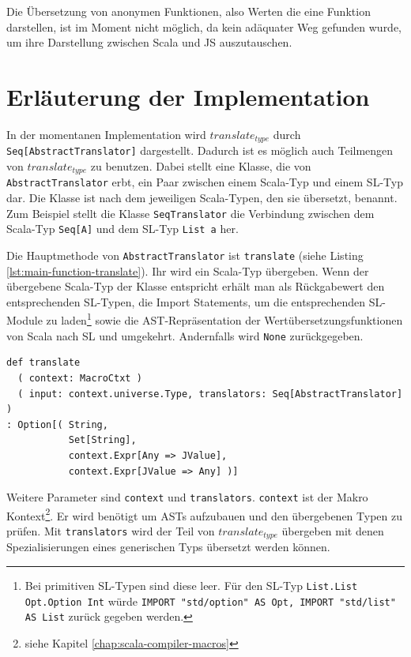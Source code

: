 \documentclass[12pt,bibtotoc]{scrreprt}
\begin{document}
Die Übersetzung von anonymen Funktionen, also Werten die eine Funktion darstellen, ist im Moment nicht möglich, da kein adäquater Weg gefunden wurde, um ihre Darstellung zwischen Scala und JS auszutauschen.

\section{Erläuterung der Implementation}
\label{sec:trans-implementation}

In der momentanen Implementation wird $translate_{type}$ durch \lstinline!Seq[AbstractTranslator]! dargestellt. Dadurch ist es möglich auch Teilmengen von $translate_{type}$ zu benutzen. Dabei stellt eine Klasse, die von \lstinline!AbstractTranslator! erbt, ein Paar zwischen einem Scala-Typ und einem SL-Typ dar. Die Klasse ist nach dem jeweiligen Scala-Typen, den sie übersetzt, benannt. Zum Beispiel stellt die Klasse \lstinline!SeqTranslator! die Verbindung zwischen dem Scala-Typ \lstinline!Seq[A]! und dem SL-Typ \lstinline!List a! her. 

Die Hauptmethode von \lstinline!AbstractTranslator! ist \lstinline!translate! (siehe Listing \ref{lst:main-function-translate}). Ihr wird ein Scala-Typ übergeben. Wenn der übergebene Scala-Typ der Klasse entspricht erhält man als Rückgabewert den entsprechenden SL-Typen, die Import Statements, um die entsprechenden SL-Module zu laden\footnote{Bei primitiven SL-Typen sind diese leer. Für den SL-Typ \lstinline!List.List Opt.Option Int! würde \lstinline!IMPORT "std/option" AS Opt, IMPORT "std/list" AS List! zurück gegeben werden.} sowie die \ac{AST}-Repräsentation der Wertübersetzungsfunktionen von Scala nach SL und umgekehrt. Andernfalls wird \lstinline!None! zurückgegeben.

\begin{lstlisting}[caption=Hauptfunktion in AbstractTranslator, label=lst:main-function-translate]
def translate
  ( context: MacroCtxt )
  ( input: context.universe.Type, translators: Seq[AbstractTranslator] )
: Option[( String, 
           Set[String], 
           context.Expr[Any => JValue], 
           context.Expr[JValue => Any] )]
\end{lstlisting}

Weitere Parameter sind \lstinline!context! und \lstinline!translators!. \lstinline!context! ist der Makro Kontext\footnote{siehe Kapitel \ref{chap:scala-compiler-macros}}. Er wird benötigt um \ac{AST}s aufzubauen und den übergebenen Typen zu prüfen. Mit \lstinline!translators! wird der Teil von $translate_{type}$ übergeben mit denen Spezialisierungen eines generischen Typs übersetzt werden können.
\end{document}
